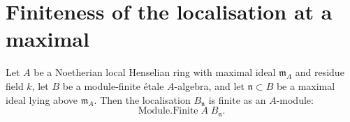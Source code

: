 \section{Finiteness of the localisation at a maximal}

\begin{theorem}
\label{thm:localisation-finite-at-maximal}
Let $A$ be a Noetherian local Henselian ring with maximal ideal
$\mathfrak m_A$ and residue field $k$, let $B$ be a module-finite
étale $A$-algebra, and let $\mathfrak n \subset B$ be a maximal
ideal lying above $\mathfrak m_A$. Then the localisation
$B_{\mathfrak n}$ is finite as an $A$-module:
\[
  \mathrm{Module.Finite}\;A\;B_{\mathfrak n}.
\]
\end{theorem}

